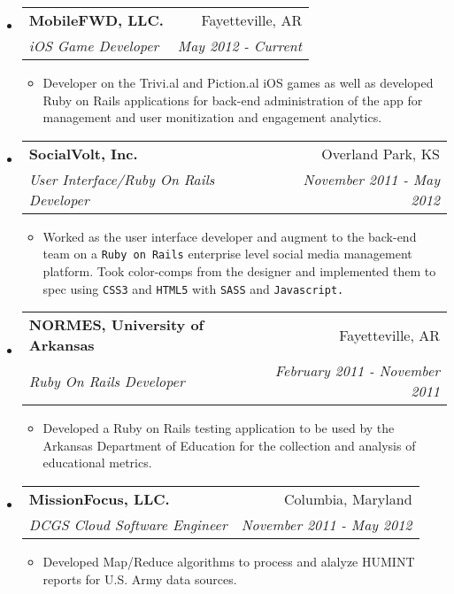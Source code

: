 \documentclass[letterpaper,13pt]{article}
\makeatletter
\newcommand{\resitem}[1]{\item #1 \vspace{-2pt}}
\newcommand{\ressubheading}[4]{

\begin{tabular*}{6.5in}{l@{\cftdotfill{\cftsecdotsep}\extracolsep{\fill}}r}

		\textbf{#1} & #2 \\

		\textit{#3} & \textit{#4} \\

\end{tabular*}\vspace{-4pt}}
\makeatother
\begin{document}
\begin{itemize}

\item

	\ressubheading{MobileFWD, LLC.}{Fayetteville, AR}{iOS Game Developer}{May 2012 - Current}

	\begin{itemize}

		\resitem{Developer on the Trivi.al and Piction.al iOS games as well as developed Ruby on Rails applications for back-end administration of the app for management and user monitization and engagement analytics.}

	\end{itemize}
	
\item

	\ressubheading{SocialVolt, Inc.}{Overland Park, KS}{User Interface/Ruby On Rails Developer}{November 2011 - May 2012}

	\begin{itemize}

		\resitem{Worked as the user interface developer and augment to the back-end team on a \texttt{Ruby on Rails} enterprise level social media management platform. Took color-comps from the designer and implemented them to spec using \texttt{CSS3} and \texttt{HTML5} with \texttt{SASS} and \texttt{Javascript.}}

	\end{itemize}
	
\item

	\ressubheading{NORMES, University of Arkansas}{Fayetteville, AR}{Ruby On Rails Developer}{February 2011 - November 2011}

	\begin{itemize}

		\resitem{Developed a Ruby on Rails testing application to be used by the Arkansas Department of Education for the collection and analysis of educational metrics.}

	\end{itemize}
	
\item

	\ressubheading{MissionFocus, LLC.}{Columbia, Maryland}{DCGS Cloud Software Engineer}{November 2011 - May 2012}

	\begin{itemize}

		\resitem{Developed Map/Reduce algorithms to process and alalyze HUMINT reports for U.S. Army data sources.}
		

\end{itemize}
\end{itemize}
\end{document}
